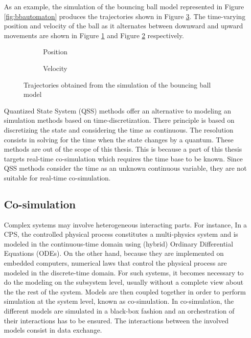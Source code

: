As an example, the simulation of the bouncing ball model represented in Figure \ref{fig:bbautomaton} produces the trajectories shown in Figure \ref{fig:bbsim}. The time-varying position and velocity of the ball as it alternates between downward and upward movements are shown in Figure \ref{fig:bbpos} and Figure \ref{fig:bbve} respectively.

\begin{figure}[phtb]
\centering
\begin{subfigure}{\textwidth}
  \centering
  
  \caption{Position}
  \label{fig:bbpos}
\end{subfigure}

\begin{subfigure}{\textwidth}
  \centering
  
  \caption{Velocity}
  \label{fig:bbve}
\end{subfigure}
\caption{Trajectories obtained from the simulation of the bouncing ball model}
\label{fig:bbsim}
\end{figure}

Quantized State System (QSS) methods \cite{kofman:2001} offer an alternative to modeling an simulation methods based on time-discretization. There principle is based on discretizing the state and considering the time as continuous. The resolution consists in solving for the time when the state changes by a quantum. These methods are out of the scope of this thesis. This is because a part of this thesis targets real-time co-simulation which requires the time base to be known. Since QSS methods consider the time as an unknown continuous variable, they are not suitable for real-time co-simulation.  

\subsection{Co-simulation}

Complex systems may involve heterogeneous interacting parts. For instance, In a CPS, the controlled physical process constitutes a multi-physics system and is modeled in the continuous-time domain using (hybrid) Ordinary Differential Equations (ODEs). On the other hand, because they are implemented on embedded computers, numerical laws that control the physical process are modeled in the discrete-time domain. For such systems, it becomes necessary to do the modeling on the subsystem level, usually without a complete view about the the rest of the system. Models are then coupled together in order to perform simulation at the system level, known as co-simulation. In co-simulation, the different models are simulated in a black-box fashion and an orchestration of their interactions has to be ensured. The interactions between the involved models consist in data exchange.

